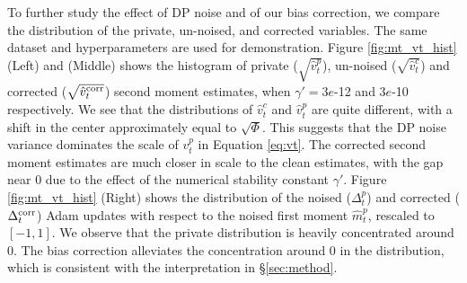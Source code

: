 \documentclass[letterpaper]{article} %
\begin{document}
\begin{table}[t]
\centering
\renewcommand{\arraystretch}{1.1}
\caption{Moment estimates with un-noised and noised gradient, w/ and w/o bias correction, at step $t=10000$.}
\label{tab:exp2}
\end{table}

To further study the effect of DP noise and of our bias correction, we compare the distribution of the private, un-noised, and corrected variables. The same dataset and hyperparameters are used for demonstration.
%
Figure \ref{fig:mt_vt_hist} (Left) and (Middle) shows the histogram of private ($\sqrt{\hat{v}_t^p}$), un-noised ($\sqrt{\hat{v}_t^c}$) and corrected ($\sqrt{\hat{v}_t^{\textnormal{corr}}}$) second moment estimates, when $\gamma'=3e$-12 and $3e$-10 respectively.
We see that the distributions of $\hat{v}_t^c$ and $\hat{v}_t^p$ are quite different, with a shift in the center approximately equal to $\sqrt{\Phi}$. This suggests that the DP noise variance dominates the scale of $v_t^p$ in Equation \ref{eq:vt}. The corrected second moment estimates are much closer in scale to the clean estimates, with the gap near 0 due to the effect of the numerical stability constant $\gamma'$.
Figure \ref{fig:mt_vt_hist} (Right) shows the distribution of the noised ($\Delta_t^p$) and corrected ($\Delta_t^{\textnormal{corr}}$) Adam updates with respect to the noised first moment $\hat{m}_t^{p}$, rescaled to $[-1, 1]$. We observe that the private distribution is heavily concentrated around 0. The bias correction alleviates the concentration around 0 in the distribution, which is consistent with the interpretation in \S \ref{sec:method}.
\end{document}
